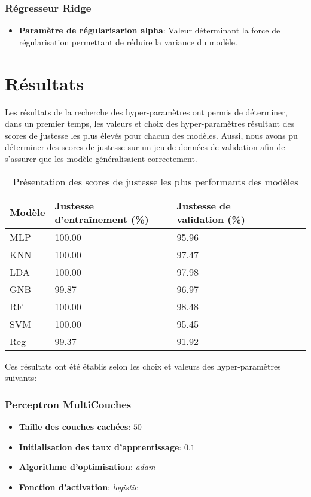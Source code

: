 \subsubsection*{Régresseur Ridge}
\begin{itemize}
	\item \textbf{Paramètre de régularisarion alpha}: Valeur déterminant la force de régularisation permettant de réduire la variance du modèle.
\end{itemize}

\newpage
\section{Résultats}
Les résultats de la recherche des hyper-paramètres ont permis de déterminer, dans un premier temps, les valeurs et choix des hyper-paramètres résultant des scores de justesse les plus élevés pour chacun des modèles. 
Aussi, nous avons pu déterminer des scores de justesse sur un jeu de données de validation afin de s'assurer que les modèle généralisaient correctement. 

\begin{table}[H]
	\centering
	\caption{Présentation des scores de justesse les plus performants des modèles}
	\label{tab:accuracies_models}
	\begin{tabular}{lllp{3cm}p{3cm}l}
		\midrule
		Modèle & Justesse d'entraînement (\%)& Justesse de validation (\%)\\
		\midrule\midrule
		MLP & 100.00 & 95.96\\
		KNN  & 100.00 & 97.47\\
		LDA  & 100.00 & 97.98\\
		GNB  & 99.87 & 96.97\\
		RF  &  100.00 & 98.48\\
		SVM  & 100.00 & 95.45\\
		Reg  & 99.37 & 91.92\\
		\midrule
	\end{tabular}
\end{table}

Ces résultats ont été établis selon les choix et valeurs des hyper-paramètres suivants:
\subsubsection*{Perceptron MultiCouches}
\begin{itemize}
	\item \textbf{Taille des couches cachées}: $50$
	\item \textbf{Initialisation des taux d'apprentissage}: $0.1$
	\item \textbf{Algorithme d'optimisation}: \emph{adam}
	\item \textbf{Fonction d'activation}: \emph{logistic}
\end{itemize}

